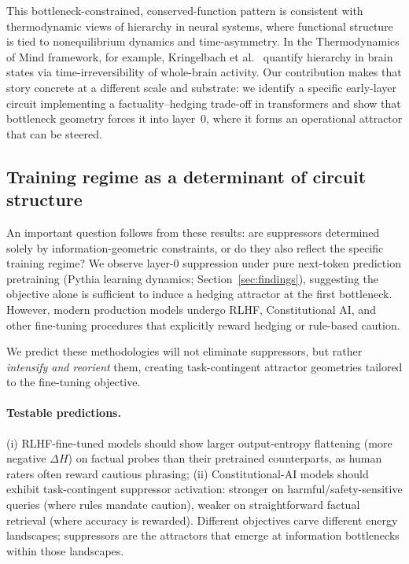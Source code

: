 This bottleneck-constrained, conserved-function pattern is consistent with thermodynamic views of hierarchy in neural systems, where functional structure is tied to nonequilibrium dynamics and time-asymmetry.
In the Thermodynamics of Mind framework, for example, Kringelbach et al.~\cite{kringelbach2024thermodynamics} quantify hierarchy in brain states via time-irreversibility of whole-brain activity.
Our contribution makes that story concrete at a different scale and substrate: we identify a specific early-layer circuit implementing a factuality–hedging trade-off in transformers and show that bottleneck geometry forces it into layer~0, where it forms an operational attractor that can be steered.

\subsection{Training regime as a determinant of circuit structure}
An important question follows from these results: are suppressors determined solely by information-geometric constraints, or do they also reflect the specific training regime? We observe layer-0 suppression under pure next-token prediction pretraining (Pythia learning dynamics; Section~\ref{sec:findings}), suggesting the objective alone is sufficient to induce a hedging attractor at the first bottleneck. However, modern production models undergo RLHF, Constitutional AI, and other fine-tuning procedures that explicitly reward hedging or rule-based caution.

We predict these methodologies will not eliminate suppressors, but rather \emph{intensify and reorient} them, creating task-contingent attractor geometries tailored to the fine-tuning objective.

\paragraph{Testable predictions.} (i) RLHF-fine-tuned models should show larger output-entropy flattening (more negative $\Delta H$) on factual probes than their pretrained counterparts, as human raters often reward cautious phrasing; (ii) Constitutional-AI models should exhibit task-contingent suppressor activation: stronger on harmful/safety-sensitive queries (where rules mandate caution), weaker on straightforward factual retrieval (where accuracy is rewarded). Different objectives carve different energy landscapes; suppressors are the attractors that emerge at information bottlenecks within those landscapes.

